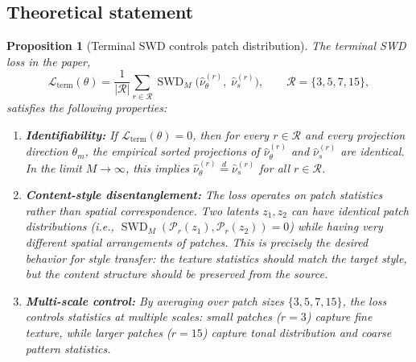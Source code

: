\documentclass[letterpaper]{article}
\newtheorem{proposition}{Proposition}[section]
\newcommand{\SWD}{\operatorname{SWD}}
\newcommand{\cL}{\mathcal{L}}
\begin{document}
\subsection{Theoretical statement}

\begin{proposition}[Terminal SWD controls patch distribution]
\label{prop:terminal_swd}
The terminal SWD loss in the paper,
\begin{equation}
    \cL_{\text{term}}(\theta) = \frac{1}{|\mathcal{R}|} \sum_{r \in \mathcal{R}}
        \SWD_M\bigl( \hat\nu_\theta^{(r)},\; \hat\nu_s^{(r)} \bigr),
    \qquad \mathcal{R} = \{3, 5, 7, 15\},
    \label{eq:terminal_swd_loss}
\end{equation}
satisfies the following properties:

\begin{enumerate}[nosep]
    \item \textbf{Identifiability:}
    If $\cL_{\text{term}}(\theta) = 0$, then for every $r \in \mathcal{R}$
    and every projection direction $\theta_m$, the empirical sorted
    projections of $\hat\nu_\theta^{(r)}$ and $\hat\nu_s^{(r)}$ are identical.
    In the limit $M \to \infty$, this implies
    $\hat\nu_\theta^{(r)} \overset{d}{=} \hat\nu_s^{(r)}$ for all $r \in \mathcal{R}$.

    \item \textbf{Content-style disentanglement:}
    The loss operates on patch statistics rather than spatial correspondence.
    Two latents $z_1, z_2$ can have identical patch distributions
    (i.e., $\SWD_M(\mathcal{P}_r(z_1), \mathcal{P}_r(z_2)) = 0$)
    while having very different spatial arrangements of patches.
    This is precisely the desired behavior for style transfer: the
    texture statistics should match the target style, but the content
    structure should be preserved from the source.

    \item \textbf{Multi-scale control:}
    By averaging over patch sizes $\{3,5,7,15\}$, the loss controls
    statistics at multiple scales: small patches ($r=3$) capture fine
    texture, while larger patches ($r=15$) capture tonal distribution
    and coarse pattern statistics.
\end{enumerate}
\end{proposition}
\end{document}
